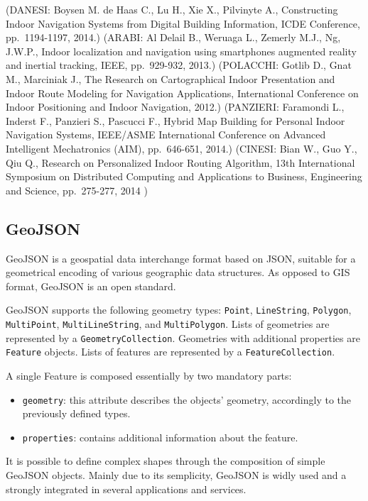 \documentclass[]{article}
\begin{document}
(DANESI: Boysen M. de Haas C., Lu H., Xie X., Pilvinyte A., Constructing
Indoor Navigation Systems from Digital Building Information, ICDE
Conference, pp.~1194-1197, 2014.) (ARABI: Al Delail B., Weruaga L.,
Zemerly M.J., Ng, J.W.P., Indoor localization and navigation using
smartphones augmented reality and inertial tracking, IEEE, pp.~929-932,
2013.) (POLACCHI: Gotlib D., Gnat M., Marciniak J., The Research on
Cartographical Indoor Presentation and Indoor Route Modeling for
Navigation Applications, International Conference on Indoor Positioning
and Indoor Navigation, 2012.) (PANZIERI: Faramondi L., Inderst F.,
Panzieri S., Pascucci F., Hybrid Map Building for Personal Indoor
Navigation Systems, IEEE/ASME International Conference on Advanced
Intelligent Mechatronics (AIM), pp.~646-651, 2014.) (CINESI: Bian W.,
Guo Y., Qiu Q., Research on Personalized Indoor Routing Algorithm, 13th
International Symposium on Distributed Computing and Applications to
Business, Engineering and Science, pp.~275-277, 2014 )

\subsection{GeoJSON}\label{geojson}

GeoJSON is a geospatial data interchange format based on JSON, suitable
for a geometrical encoding of various geographic data structures. As
opposed to GIS format, GeoJSON is an open standard.

GeoJSON supports the following geometry types: \texttt{Point},
\texttt{LineString}, \texttt{Polygon}, \texttt{MultiPoint},
\texttt{MultiLineString}, and \texttt{MultiPolygon}. Lists of geometries
are represented by a \texttt{GeometryCollection}. Geometries with
additional properties are \texttt{Feature} objects. Lists of features
are represented by a \texttt{FeatureCollection}.

A single Feature is composed essentially by two mandatory parts:

\begin{itemize}
\itemsep1pt\parskip0pt
\item
  \texttt{geometry}: this attribute describes the objects' geometry,
  accordingly to the previously defined types.
\item
  \texttt{properties}: contains additional information about the
  feature.
\end{itemize}

It is possible to define complex shapes through the composition of
simple GeoJSON objects. Mainly due to its semplicity, GeoJSON is widly
used and a strongly integrated in several applications and services.
\end{document}
